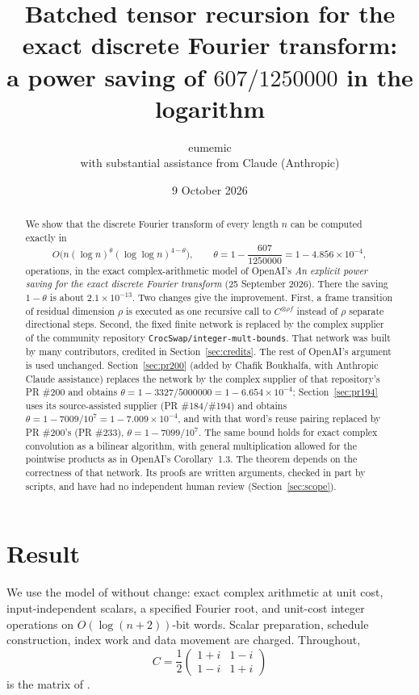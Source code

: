 \documentclass[11pt]{article}
\title{Batched tensor recursion for the exact discrete Fourier transform:\\
\large a power saving of $607/1250000$ in the logarithm}
\author{eumemic\\\small with substantial assistance from Claude (Anthropic)}
\date{9 October 2026}
\theoremstyle{definition}
\begin{document}
\maketitle

\begin{abstract}
We show that the discrete Fourier transform of every length $n$ can be computed
exactly in
\[
 O\bigl(n(\log n)^{\theta}(\log\log n)^{4-\theta}\bigr),\qquad
 \theta=1-\frac{607}{1250000}=1-4.856\times10^{-4},
\]
operations, in the exact complex-arithmetic model of OpenAI's
\emph{An explicit power saving for the exact discrete Fourier transform}
(25 September 2026). There the saving $1-\theta$ is about $2.1\times10^{-13}$.
Two changes give the improvement. First, a frame transition of residual
dimension $\rho$ is executed as one recursive call to $C^{\otimes\rho f}$
instead of $\rho$ separate directional steps. Second, the fixed finite network
is replaced by the complex supplier of the community repository
\texttt{CrocSwap/integer-mult-bounds}. That network was built by many
contributors, credited in Section~\ref{sec:credits}. The rest of OpenAI's
argument is used unchanged. Section~\ref{sec:pr200} (added by Chafik Boukhalfa,
with Anthropic Claude assistance) replaces the network by the complex supplier
of that repository's PR \#200 and obtains $\theta=1-3327/5000000=1-6.654\times10^{-4}$;
Section~\ref{sec:pr194} uses its source-assisted supplier (PR \#184/\#194) and
obtains $\theta=1-7009/10^{7}=1-7.009\times10^{-4}$, and with that word's
reuse pairing replaced by PR \#200's (PR \#233), $\theta=1-7099/10^{7}$. The same bound holds for exact complex convolution
as a bilinear algorithm, with general multiplication allowed for the pointwise
products as in OpenAI's Corollary~1.3. The theorem depends on the correctness of that network. Its
proofs are written arguments, checked in part by scripts, and have had no
independent human review (Section~\ref{sec:scope}).
\end{abstract}

\section{Result}
We use the model of \cite[\S1.1]{oai-dft} without change: exact complex
arithmetic at unit cost, input-independent scalars, a specified Fourier root,
and unit-cost integer operations on $O(\log(n+2))$-bit words. Scalar
preparation, schedule construction, index work and data movement are charged.
Throughout,
\[
 C=\frac12\begin{pmatrix}1+i&1-i\\1-i&1+i\end{pmatrix}
\]
is the matrix of \cite[(2.1)]{oai-dft}.
\end{document}
